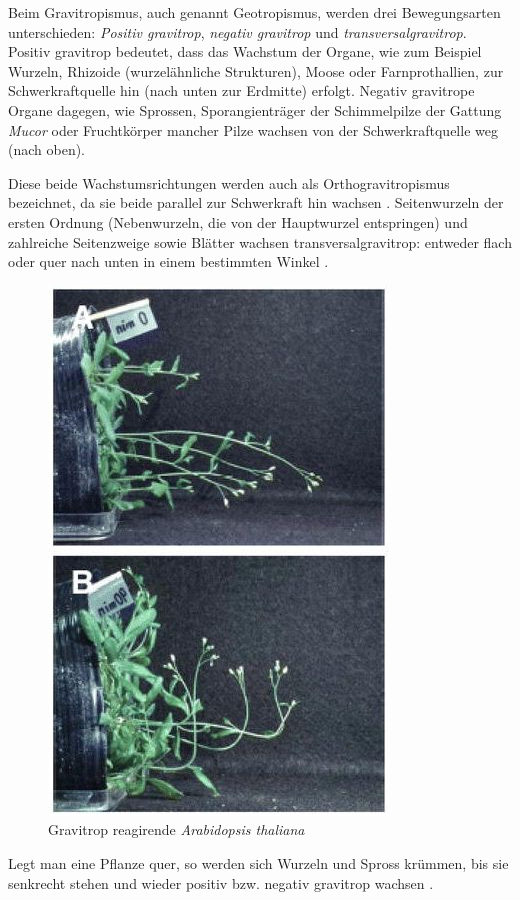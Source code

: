 \documentclass[
a4paper, 
11pt, 
ngerman,
listof=totoc,
bibliography=totocnumbered,
abstracton
]{scrreprt}
\begin{document}



Beim Gravitropismus, auch genannt Geotropismus, werden drei Bewegungsarten unterschieden: \emph{Positiv gravitrop},  \emph{negativ gravitrop} und  \emph{transversalgravitrop}.
Positiv gravitrop bedeutet, dass das Wachstum der Organe, wie zum Beispiel Wurzeln, Rhizoide (wurzelähnliche Strukturen), Moose oder Farnprothallien, zur Schwerkraftquelle hin (nach unten zur Erdmitte) erfolgt.
Negativ gravitrope Organe dagegen, wie Sprossen, Sporangienträger der Schimmelpilze der Gattung \emph{Mucor} oder Fruchtkörper mancher Pilze wachsen von der Schwerkraftquelle weg (nach oben).


Diese beide Wachstumsrichtungen werden auch als Orthogravitropismus bezeichnet, da sie beide parallel zur Schwerkraft hin wachsen \parencite[546]{Jacob}.
Seitenwurzeln der ersten Ordnung (Nebenwurzeln, die von der Hauptwurzel entspringen) und zahlreiche Seitenzweige sowie Blätter wachsen transversalgravitrop: entweder flach oder quer nach unten in einem bestimmten Winkel \parencite[449]{Strasburger}. 

\begin{figure}[H]
\centering 
 \includegraphics[width = 0.4\linewidth]{bilder/gravitrop_reagierende_Pflanze.jpg}
 \caption{Gravitrop reagirende \emph{Arabidopsis thaliana}}
\end{figure} 
 
Legt man eine Pflanze quer, so werden sich Wurzeln und Spross krümmen, bis sie senkrecht stehen und wieder positiv bzw. negativ gravitrop wachsen
\parencite[528]{Luettge}.
\end{document}
